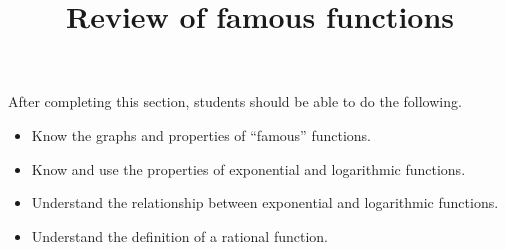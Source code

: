 \documentclass{ximera}
\title{Review of famous functions}
\begin{document}
\begin{abstract}
\end{abstract}

\maketitle

\begin{sectionOutcomes}
After completing this section, students should be able to do the following.

\begin{itemize}
	\item Know the graphs and properties of ``famous'' functions.
	\item Know and use the properties of exponential and logarithmic functions.
	\item Understand the relationship between exponential and logarithmic functions.
  \item Understand the definition of a rational function.
\end{itemize}
\end{sectionOutcomes}
\end{document}
